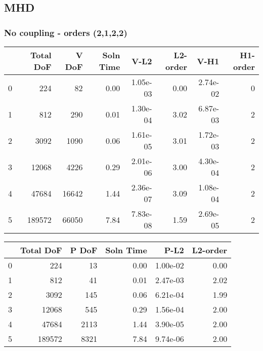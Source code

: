 \documentclass[12pt]{extarticle}
\numberwithin{equation}{section}    %
\begin{document}
\newpage

\subsection*{MHD}

\subsubsection*{No coupling - orders (2,1,2,2)}
\begin{tabular}{lrrrrrrr}
\hline
{} &  Total DoF &  V DoF &  Soln Time &      V-L2 &  L2-order &      V-H1 &  H1-order \\
\hline
0 &        224 &     82 &       0.00 &  1.05e-03 &      0.00 &  2.74e-02 &         0 \\
1 &        812 &    290 &       0.01 &  1.30e-04 &      3.02 &  6.87e-03 &         2 \\
2 &       3092 &   1090 &       0.06 &  1.61e-05 &      3.01 &  1.72e-03 &         2 \\
3 &      12068 &   4226 &       0.29 &  2.01e-06 &      3.00 &  4.30e-04 &         2 \\
4 &      47684 &  16642 &       1.44 &  2.36e-07 &      3.09 &  1.08e-04 &         2 \\
5 &     189572 &  66050 &       7.84 &  7.83e-08 &      1.59 &  2.69e-05 &         2 \\

\hline
\end{tabular}



\begin{tabular}{lrrrrr}
\hline
{} &  Total DoF &  P DoF &  Soln Time &      P-L2 &  L2-order \\
\hline
0 &        224 &     13 &       0.00 &  1.00e-02 &      0.00 \\
1 &        812 &     41 &       0.01 &  2.47e-03 &      2.02 \\
2 &       3092 &    145 &       0.06 &  6.21e-04 &      1.99 \\
3 &      12068 &    545 &       0.29 &  1.56e-04 &      2.00 \\
4 &      47684 &   2113 &       1.44 &  3.90e-05 &      2.00 \\
5 &     189572 &   8321 &       7.84 &  9.74e-06 &      2.00 \\
\hline
\end{tabular}
\end{document}
